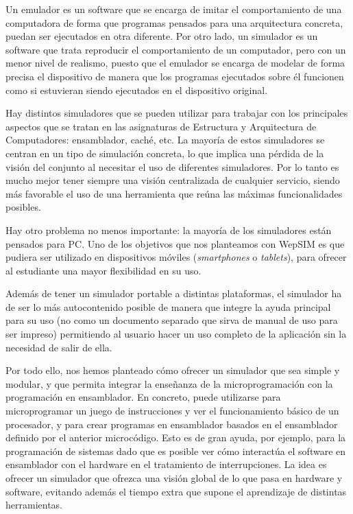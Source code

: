 Un emulador es un software que se encarga de imitar el comportamiento de una computadora de forma que programas pensados para una arquitectura concreta, puedan ser ejecutados en otra diferente. Por otro lado, un simulador es un software que trata reproducir el comportamiento de un computador, pero con un menor nivel de realismo, puesto que el emulador se encarga de modelar de forma precisa el dispositivo de manera que los programas ejecutados sobre él funcionen como si estuvieran siendo ejecutados en el dispositivo original.

Hay distintos simuladores que se pueden utilizar para trabajar con los principales aspectos que se tratan en las asignaturas de Estructura y Arquitectura de Computadores: ensamblador, caché, etc. La mayoría de estos simuladores se centran en un tipo de simulación concreta, lo que implica una pérdida de la visión del conjunto al necesitar el uso de diferentes simuladores. Por lo tanto es mucho mejor tener siempre una visión centralizada de cualquier servicio, siendo más favorable el uso de una herramienta que reúna las máximas funcionalidades posibles.

Hay otro problema no menos importante: la mayoría de los simuladores están pensados para PC. Uno de los objetivos que nos planteamos con WepSIM es que pudiera ser utilizado en dispositivos móviles (\emph{smartphones} o \emph{tablets}), para ofrecer al estudiante una mayor flexibilidad en su uso.

Además de tener un simulador portable a distintas plataformas, el simulador ha de ser lo más autocontenido posible de manera que integre la ayuda principal para su uso (no como un documento separado que sirva de manual de uso para ser impreso) permitiendo al usuario hacer un uso completo de la aplicación sin la necesidad de salir de ella.

Por todo ello, nos hemos planteado cómo ofrecer un simulador que sea simple y modular, y que permita integrar la enseñanza de la microprogramación con la programación en ensamblador. En concreto, puede utilizarse para microprogramar un juego de instrucciones y ver el funcionamiento básico de un procesador, y para crear programas en ensamblador basados en el ensamblador definido por el anterior microcódigo. Esto es de gran ayuda, por ejemplo, para la programación de sistemas dado que es posible ver cómo interactúa el software en ensamblador con el hardware en el tratamiento de interrupciones. La idea es ofrecer un simulador que ofrezca una visión global de lo que pasa en hardware y software, evitando además el tiempo extra que supone el aprendizaje de distintas herramientas.


